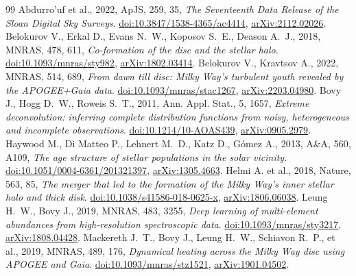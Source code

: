 \documentclass[11pt,a4paper]{article}
\begin{document}
\begin{thebibliography}{99}
 Abdurro'uf et al., 2022, ApJS, 259, 35, \emph{The Seventeenth Data Release of the Sloan Digital Sky Surveys}. \href{https://doi.org/10.3847/1538-4365/ac4414}{doi:10.3847/1538-4365/ac4414}, \href{https://arxiv.org/abs/2112.02026}{arXiv:2112.02026}.
 Belokurov V., Erkal D., Evans N.~W., Koposov S.~E., Deason A.~J., 2018, MNRAS, 478, 611, \emph{Co-formation of the disc and the stellar halo}. \href{https://doi.org/10.1093/mnras/sty982}{doi:10.1093/mnras/sty982}, \href{https://arxiv.org/abs/1802.03414}{arXiv:1802.03414}.
 Belokurov V., Kravtsov A., 2022, MNRAS, 514, 689, \emph{From dawn till disc: Milky Way's turbulent youth revealed by the APOGEE+Gaia data}. \href{https://doi.org/10.1093/mnras/stac1267}{doi:10.1093/mnras/stac1267}, \href{https://arxiv.org/abs/2203.04980}{arXiv:2203.04980}.
 Bovy J., Hogg D.~W., Roweis S.~T., 2011, Ann. Appl. Stat., 5, 1657, \emph{Extreme deconvolution: inferring complete distribution functions from noisy, heterogeneous and incomplete observations}. \href{https://doi.org/10.1214/10-AOAS439}{doi:10.1214/10-AOAS439}, \href{https://arxiv.org/abs/0905.2979}{arXiv:0905.2979}.
 Haywood M., Di Matteo P., Lehnert M.~D., Katz D., G\'omez A., 2013, A\&A, 560, A109, \emph{The age structure of stellar populations in the solar vicinity}. \href{https://doi.org/10.1051/0004-6361/201321397}{doi:10.1051/0004-6361/201321397}, \href{https://arxiv.org/abs/1305.4663}{arXiv:1305.4663}.
 Helmi A. et al., 2018, Nature, 563, 85, \emph{The merger that led to the formation of the Milky Way's inner stellar halo and thick disk}. \href{https://doi.org/10.1038/s41586-018-0625-x}{doi:10.1038/s41586-018-0625-x}, \href{https://arxiv.org/abs/1806.06038}{arXiv:1806.06038}.
 Leung H.~W., Bovy J., 2019, MNRAS, 483, 3255, \emph{Deep learning of multi-element abundances from high-resolution spectroscopic data}. \href{https://doi.org/10.1093/mnras/sty3217}{doi:10.1093/mnras/sty3217}, \href{https://arxiv.org/abs/1808.04428}{arXiv:1808.04428}.
 Mackereth J.~T., Bovy J., Leung H.~W., Schiavon R.~P., et al., 2019, MNRAS, 489, 176, \emph{Dynamical heating across the Milky Way disc using APOGEE and Gaia}. \href{https://doi.org/10.1093/mnras/stz1521}{doi:10.1093/mnras/stz1521}, \href{https://arxiv.org/abs/1901.04502}{arXiv:1901.04502}.

\end{thebibliography}
\end{document}
